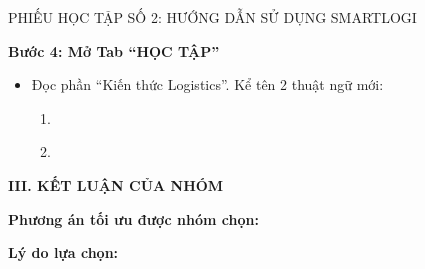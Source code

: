 \documentclass[12pt,a4paper]{article}
\begin{document}
\begin{phieuhoctap}{PHIẾU HỌC TẬP SỐ 2: HƯỚNG DẪN SỬ DỤNG SMARTLOGI}
\begin{itemize}
\underline{\hspace{\textwidth}}
\end{itemize}

\vspace{0.5cm}
\textbf{\color{accent}Bước 4: Mở Tab ``HỌC TẬP''}
\begin{itemize}
\item Đọc phần ``Kiến thức Logistics''. Kể tên 2 thuật ngữ mới:
    \begin{enumerate}
    \item \underline{\hspace{6cm}}
    \item \underline{\hspace{6cm}}
    \end{enumerate}
\end{itemize}

\vspace{0.5cm}
\textbf{\color{primary}III. KẾT LUẬN CỦA NHÓM}

\textbf{Phương án tối ưu được nhóm chọn:}

\underline{\hspace{\textwidth}}

\textbf{Lý do lựa chọn:}

\underline{\hspace{\textwidth}}

\underline{\hspace{\textwidth}}
\end{phieuhoctap}
\end{document}
